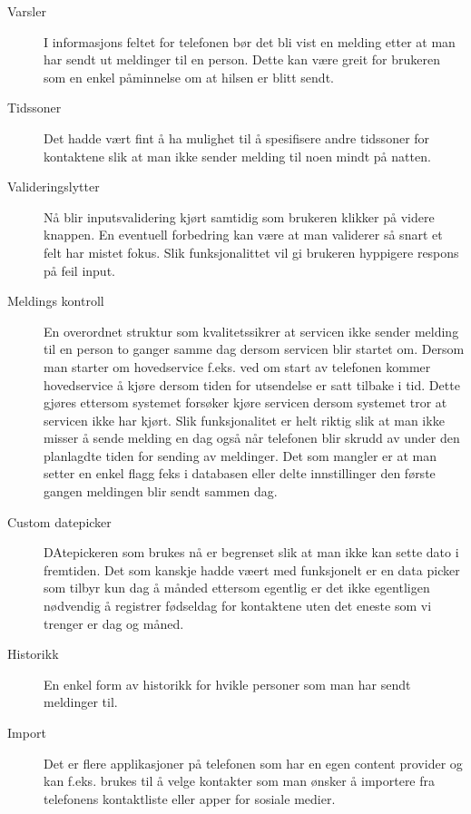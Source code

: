 \begin{description}
\item[Varsler]
I informasjons feltet for telefonen bør det bli vist en melding etter at man har sendt ut meldinger til en person. Dette kan være greit for brukeren som en enkel påminnelse om at hilsen er blitt sendt.

\item[Tidssoner]
Det hadde vært fint å ha mulighet til å spesifisere andre tidssoner for kontaktene slik at man ikke sender melding til noen mindt på natten.

\item[Valideringslytter]
Nå blir inputsvalidering kjørt samtidig som brukeren klikker på videre knappen. En eventuell forbedring kan være at man validerer så snart et felt har mistet fokus. Slik funksjonalittet vil gi brukeren hyppigere respons på feil input. 

\item[Meldings kontroll]
En overordnet struktur som kvalitetssikrer at servicen ikke sender melding til en person to ganger samme dag dersom servicen blir startet om. Dersom man starter om hovedservice f.eks. ved om start av telefonen kommer hovedservice å kjøre dersom tiden for utsendelse er satt tilbake i tid. Dette gjøres ettersom systemet forsøker kjøre servicen dersom systemet tror at servicen ikke har kjørt. Slik funksjonalitet er helt riktig slik at man ikke misser å sende melding en dag også når telefonen blir skrudd av under den planlagdte tiden for sending av meldinger. Det som mangler er at man setter en enkel flagg feks i databasen eller delte innstillinger den første gangen meldingen blir sendt sammen dag.


\item[Custom datepicker]
DAtepickeren som brukes nå er begrenset slik at man ikke kan sette dato i fremtiden. Det som kanskje hadde væert med funksjonelt er en data picker som tilbyr kun dag å månded ettersom egentlig er det ikke egentligen nødvendig å registrer fødseldag for kontaktene uten det eneste som vi trenger er dag og måned.

\item[Historikk]
En enkel form av historikk for hvikle personer som man har sendt meldinger til. 

\item[Import]
Det er flere applikasjoner på telefonen som har en egen content provider og kan f.eks. brukes til å velge kontakter som man ønsker å importere fra telefonens kontaktliste eller apper for sosiale medier.

\end{description}


